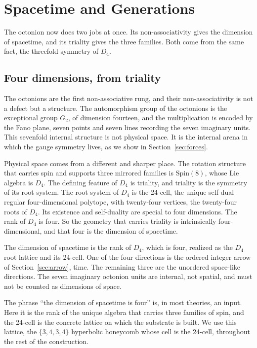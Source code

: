 \section{Spacetime and Generations} \label{sec:spacetime}

The octonion now does two jobs at once. Its non-associativity gives the dimension of spacetime, and its triality gives
the three families. Both come from the same fact, the threefold symmetry of $D_4$.

\subsection{Four dimensions, from triality}

The octonions are the first non-associative rung, and their non-associativity is not a defect but a structure. The
automorphism group of the octonions is the exceptional group $G_2$, of dimension fourteen, and the multiplication is
encoded by the Fano plane, seven points and seven lines recording the seven imaginary units. This sevenfold internal
structure is not physical space. It is the internal arena in which the gauge symmetry lives, as we show in
Section~\ref{sec:forces}.

Physical space comes from a different and sharper place. The rotation structure that carries spin and supports three
mirrored families is $\mathrm{Spin}(8)$, whose Lie algebra is $D_4$. The defining feature of $D_4$ is triality, and
triality is the symmetry of its root system. The root system of $D_4$ is the 24-cell, the unique self-dual regular
four-dimensional polytope, with twenty-four vertices, the twenty-four roots of $D_4$. Its existence and self-duality
are special to four dimensions. The rank of $D_4$ is four. So the geometry that carries triality is intrinsically
four-dimensional, and that four is the dimension of spacetime.

\begin{result}
The dimension of spacetime is the rank of $D_4$, which is four, realized as the $D_4$ root lattice and its 24-cell.
One of the four directions is the ordered integer arrow of Section~\ref{sec:arrow}, time. The remaining three are the
unordered space-like directions. The seven imaginary octonion units are internal, not spatial, and must not be
counted as dimensions of space.
\end{result}

The phrase ``the dimension of spacetime is four'' is, in most theories, an input. Here it is the rank of the unique
algebra that carries three families of spin, and the 24-cell is the concrete lattice on which the substrate is built.
We use this lattice, the $\{3,4,3,4\}$ hyperbolic honeycomb whose cell is the 24-cell, throughout the rest of the
construction.

